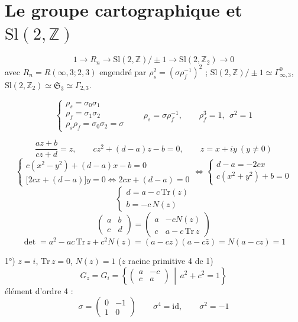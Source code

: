 \documentclass[11pt,a4paper]{article}
\begin{document}
\section{Le groupe cartographique et $\mathrm{Sl}(2,\mathbb{Z})$}


\[
1 \to R_n \to \mathrm{Sl}(2,\mathbb{Z})/\pm 1 \to \mathrm{Sl}(2,\mathbb{Z}_2) \to 0
\]
avec $R_n = R(\infty,3;2,3)$ engendré par $\rho_s^2 = (\sigma\rho_f^{-1})^2$ ; $\mathrm{Sl}(2,\mathbb{Z})/\pm 1 \simeq \Gamma^0_{\infty,3}$, $\mathrm{Sl}(2,\mathbb{Z}_2) \simeq \mathfrak{S}_3 \simeq \Gamma_{2,3}$.

\[
\begin{cases}
\rho_s = \sigma_0\sigma_1 \\
\rho_f = \sigma_1\sigma_2 \\
\rho_s\rho_f = \sigma_0\sigma_2 = \sigma
\end{cases}
\qquad \rho_s = \sigma\rho_f^{-1},
\qquad \boxed{\rho_f^3 = 1,\ \ \sigma^2 = 1}
\]

\[
\frac{az+b}{cz+d} = z, \qquad cz^2 + (d-a)z - b = 0, \qquad z = x+iy \ (y \neq 0)
\]
\[
\begin{cases}
c(x^2-y^2) + (d-a)x - b = 0 \\
\bigl[2cx + (d-a)\bigr]y = 0 \iff 2cx + (d-a) = 0
\end{cases}
\Longleftrightarrow
\begin{cases}
d-a = -2cx \\
c(x^2+y^2) + b = 0
\end{cases}
\]
\[
\begin{cases}
d = a - c\,\mathrm{Tr}(z) \\
b = -c\,N(z)
\end{cases}
\]
\[
\begin{pmatrix} a & b \\ c & d \end{pmatrix}
= \begin{pmatrix} a & -cN(z) \\ c & a - c\,\mathrm{Tr}\,z \end{pmatrix}
\]
\[
\det = a^2 - ac\,\mathrm{Tr}\,z + c^2N(z) = (a-cz)(a-c\bar z) = N(a-cz) = 1
\]

1°) $z = i$, $\mathrm{Tr}\,z = 0$, $N(z) = 1$ ($z$ racine primitive 4 de 1)
\[
G_z = G_i = \left\{ \begin{pmatrix} a & -c \\ c & a \end{pmatrix} \,\middle|\, a^2+c^2 = 1 \right\}
\]
élément d'ordre 4 :
\[
\boxed{\sigma = \begin{pmatrix} 0 & -1 \\ 1 & 0 \end{pmatrix}}
\qquad \sigma^4 = \mathrm{id}, \qquad \boxed{\sigma^2 = -1}
\]
\end{document}
